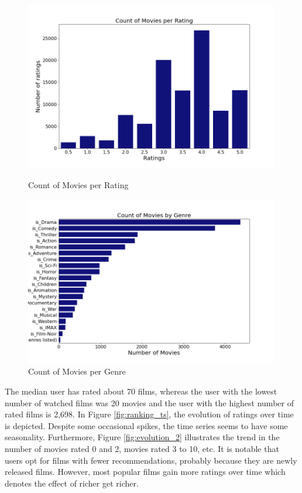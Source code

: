 \documentclass[12pt]{article}
\numberwithin{equation}{section}
\begin{document}
\begin{figure}[h!]
    \begin{minipage}[b]{0.49\linewidth}
         \centering
  	\includegraphics[width=0.99\textwidth]{count_rating.png}
  	\caption{Count of Movies per Rating}
  	\label{fig:count_ranking}
    \end{minipage}
    \hspace{0.01cm}
    \begin{minipage}[b]{0.49\linewidth}
        \centering
  	\includegraphics[width=0.99\textwidth]{count_genre.png}
  	\caption{Count of Movies per Genre}
  	\label{fig:count_genre}
    \end{minipage}
\end{figure}

The median user has rated about 70 films, whereas the user with the lowest number of watched films was 20 movies and the user with the highest number of rated films is 2,698. In Figure \ref{fig:ranking_ts}, the evolution of ratings over time is depicted. Despite some occasional spikes, the time series seems to have some seasonality. Furthermore, Figure \ref{fig:evolution_2} illustrates the trend in the number of movies rated 0 and 2, movies rated 3 to 10, etc. It is notable that users opt for films with fewer recommendations, probably because they are newly released films. However, most popular films gain more ratings over time which denotes the effect of richer get richer.
\end{document}
